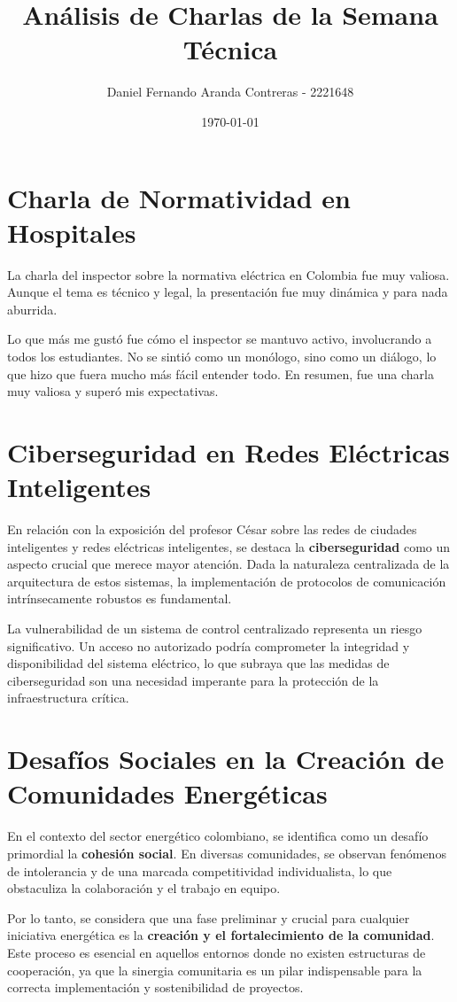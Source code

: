 \documentclass{article}
\title{Análisis de Charlas de la Semana Técnica}
\author{Daniel Fernando Aranda Contreras - 2221648}
\date{\today}
\begin{document}
\maketitle

\section*{Charla de Normatividad en Hospitales}
La charla del inspector sobre la normativa eléctrica en Colombia fue muy valiosa. Aunque el tema es técnico y legal, la presentación fue muy dinámica y para nada aburrida.

Lo que más me gustó fue cómo el inspector se mantuvo activo, involucrando a todos los estudiantes. No se sintió como un monólogo, sino como un diálogo, lo que hizo que fuera mucho más fácil entender todo. En resumen, fue una charla muy valiosa y superó mis expectativas.

\section*{Ciberseguridad en Redes Eléctricas Inteligentes}
En relación con la exposición del profesor César sobre las redes de ciudades inteligentes y redes eléctricas inteligentes, se destaca la \textbf{ciberseguridad} como un aspecto crucial que merece mayor atención. Dada la naturaleza centralizada de la arquitectura de estos sistemas, la implementación de protocolos de comunicación intrínsecamente robustos es fundamental.

La vulnerabilidad de un sistema de control centralizado representa un riesgo significativo. Un acceso no autorizado podría comprometer la integridad y disponibilidad del sistema eléctrico, lo que subraya que las medidas de ciberseguridad son una necesidad imperante para la protección de la infraestructura crítica.

\section*{Desafíos Sociales en la Creación de Comunidades Energéticas}
En el contexto del sector energético colombiano, se identifica como un desafío primordial la \textbf{cohesión social}. En diversas comunidades, se observan fenómenos de intolerancia y de una marcada competitividad individualista, lo que obstaculiza la colaboración y el trabajo en equipo.

Por lo tanto, se considera que una fase preliminar y crucial para cualquier iniciativa energética es la \textbf{creación y el fortalecimiento de la comunidad}. Este proceso es esencial en aquellos entornos donde no existen estructuras de cooperación, ya que la sinergia comunitaria es un pilar indispensable para la correcta implementación y sostenibilidad de proyectos.
\end{document}
